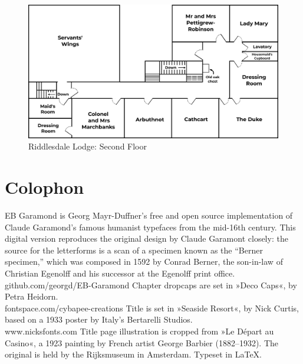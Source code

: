 \documentclass[
paper=5.5in:8.5in,
BCOR=7mm,
twoside,
DIV=calc,
11pt,
usegeometry,
chapterprefix,
headings=big]{scrbook} %
\begin{document}
\clearpage

\begin{figure}
\includegraphics[width=\columnwidth]{secondfloorlabeled}%
\caption{Riddlesdale Lodge: Second Floor}
\end{figure}




\footskip=30pt



\mainmatter
\pagestyle{headings}
\renewcommand*{\chapterpagestyle}{plain}























\clearpage
{}
\chapter*{Colophon}
\begin{center}
EB Garamond is Georg Mayr-Duffner's free and open source implementation of Claude Garamond’s famous humanist typefaces from the mid-16th century. This digital version reproduces the original design by Claude Garamont closely: the source for the letterforms is a scan of a specimen known as the \enquote{Berner specimen,} which was composed in 1592 by Conrad Berner, the son-in-law of Christian Egenolff and his successor at the Egenolff print office.  \\github.com/georgd/EB-Garamond
\vfill
Chapter dropcaps are set in »Deco Caps«, by Petra Heidorn.\\fontspace.com/cybapee-creations
\vfill
Title is set in »Seaside Resort«, by Nick Curtis, based on a 1933 poster by Italy’s Bertarelli Studios.\\www.nicksfonts.com
\vfill
Title page illustration is cropped from »Le Départ au Casino«, a 1923 painting by French artist George Barbier (1882–1932). The original is held by the Rijksmuseum in Amsterdam.
\vfill
Typeset in \LaTeX{}.
\end{center}
\thispagestyle{empty}
\end{document}
